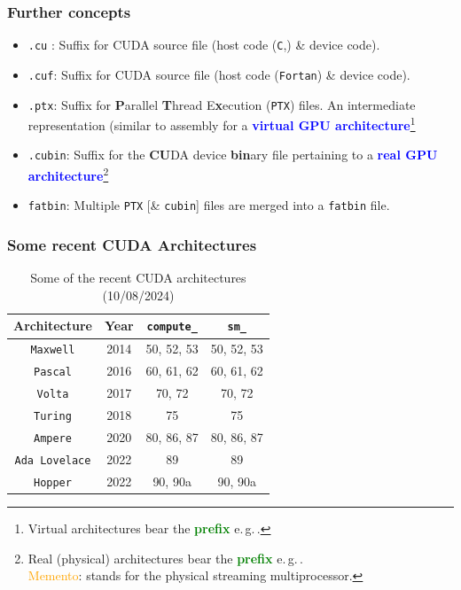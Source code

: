 \begin{frame}
   \frametitle{Further concepts}
      \begin{itemize}
	 \item \texttt{.cu} : Suffix for CUDA source file (host code (\texttt{C},\CC) \& device code).
	 \item \texttt{.cuf}: Suffix for CUDA source file (host code (\texttt{Fortan}) \& device code).
	 \item \texttt{.ptx}: Suffix for \textbf{P}arallel \textbf{T}hread E\textbf{x}ecution (\texttt{PTX}) files. 
		 An intermediate representation (similar to assembly for a 
		      \textbf{\textcolor{blue}{virtual GPU architecture}}\footnote{Virtual architectures 
		      bear the  \textbf{\textcolor{green}{prefix}} e.\,g.\,.}
	 \item \texttt{.cubin}: Suffix for the \textbf{CU}DA device \textbf{bin}ary 
		 file pertaining to a \textbf{\textcolor{blue}{real GPU architecture}}\footnote{Real (physical) architectures
		      bear the  \textbf{\textcolor{green}{prefix}} e.\,g.\,.\\
		      \hspace{4ex}\textcolor{orange}{Memento}:  stands 
		      for the physical streaming multiprocessor.}
	 \item \texttt{fatbin}: Multiple \texttt{PTX} [\& \texttt{cubin}] files are merged into a \texttt{fatbin} file.
      \end{itemize}
\end{frame}	

\begin{frame}
   \frametitle{Some recent CUDA Architectures}
      \begin{table}[H]
         \begin{center}
            \begin{tabular}{c|c|c|c}
		    Architecture            & Year & \texttt{compute\_} & \texttt{sm\_} \\
	           \hline
		      \texttt{Maxwell}      & 2014 & 50, 52, 53    & 50, 52, 53   \\ 
		      \texttt{Pascal}       & 2016 & 60, 61, 62    & 60, 61, 62 \\
		      \texttt{Volta}        & 2017 & 70, 72        & 70, 72 \\
		      \texttt{Turing}       & 2018 & 75            & 75 \\
		      \texttt{Ampere}       & 2020 & 80, 86, 87    & 80, 86, 87 \\
		      \texttt{Ada Lovelace} & 2022 & 89            & 89\\
		      \texttt{Hopper}       & 2022 & 90, 90a       & 90, 90a \\
	           \hline
            \end{tabular}
         \end{center}
         \caption{\small{Some of the recent CUDA architectures (10/08/2024)}}	      
      \end{table}
\end{frame}	


